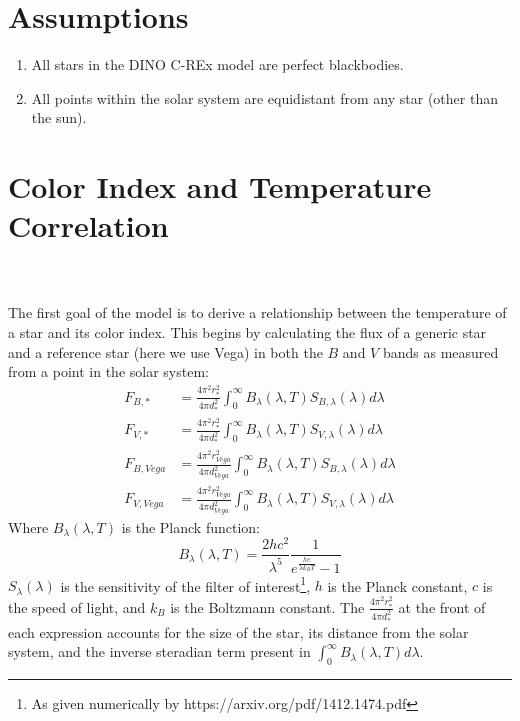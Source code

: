 \documentclass[]{DINOReportMemo}
\begin{document}
\section{Assumptions}
\begin{enumerate}
    \item All stars in the DINO C-REx model are perfect blackbodies.
    \item All points within the solar system are equidistant from any star (other than the sun).
\end{enumerate}
\section{Color Index and Temperature Correlation} \\\\
The first goal of the model is to derive a relationship between the temperature of a star and its color index. This begins by calculating the flux of a generic star and a reference star (here we use Vega) in both the $B$ and $V$ bands as measured from a point in the solar system:
\begin{equation} \label{flux_eqns}
\begin{split}
    F_{B,*} &= \frac{4\pi^2r_*^2}{4\pi d_*^2} \int_0^\infty  B_{\lambda}(\lambda,T)S_{B,\lambda}(\lambda)d\lambda \\
    F_{V,*} &= \frac{4\pi^2r_*^2}{4\pi d_*^2} \int_0^\infty  B_{\lambda}(\lambda,T)S_{V,\lambda}(\lambda)d\lambda \\
    F_{B,Vega} &= \frac{4\pi^2r_{Vega}^2}{4\pi d_{Vega}^2} \int_0^\infty  B_{\lambda}(\lambda,T)S_{B,\lambda}(\lambda)d\lambda \\
    F_{V,Vega} &= \frac{4\pi^2r_{Vega}^2}{4\pi d_{Vega}^2} \int_0^\infty  B_{\lambda}(\lambda,T)S_{V,\lambda}(\lambda)d\lambda
\end{split}
\end{equation}
Where  $B_{\lambda}(\lambda,T)$ is the Planck function:
\begin{equation}
    B_{\lambda}(\lambda,T) = \frac{2hc^2}{\lambda^5}\frac{1}{e^{\frac{hc}{\lambda k_B T}}-1}
\end{equation}
$S_{\lambda}(\lambda)$ is the sensitivity of the filter of interest\footnote{As given numerically by https://arxiv.org/pdf/1412.1474.pdf}, $h$ is the Planck constant, $c$ is the speed of light, and $k_B$ is the Boltzmann constant. The $\frac{4\pi^2r_*^2}{4\pi d_*^2}$ at the front of each expression accounts for the size of the star, its distance from the solar system, and the inverse steradian term present in $\int_0^\infty  B_{\lambda}(\lambda,T) d\lambda$.
\end{document}
